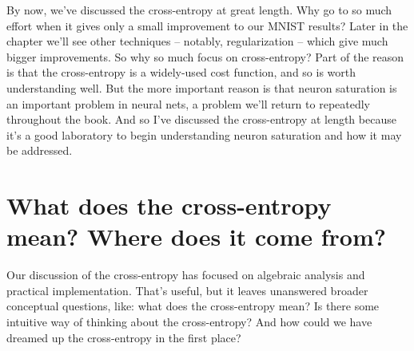\documentclass[a4paper,twoside,10pt]{book}
\begin{document}
By now, we've discussed the cross-entropy at great length. Why go to so much effort when it gives only a small improvement to our MNIST results? Later in the chapter we'll see other techniques -- notably, regularization -- which give much bigger improvements. So why so much focus on cross-entropy? Part of the reason is that the cross-entropy is a widely-used cost function, and so is worth understanding well. But the more important reason is that neuron saturation is an important problem in neural nets, a problem we'll return to repeatedly throughout the book. And so I've discussed the cross-entropy at length because it's a good laboratory to begin understanding neuron saturation and how it may be addressed.

\section{What does the cross-entropy mean? Where does it come from?}
Our discussion of the cross-entropy has focused on algebraic analysis and practical implementation. That's useful, but it leaves unanswered broader conceptual questions, like: what does the cross-entropy mean? Is there some intuitive way of thinking about the cross-entropy? And how could we have dreamed up the cross-entropy in the first place?
\end{document}
